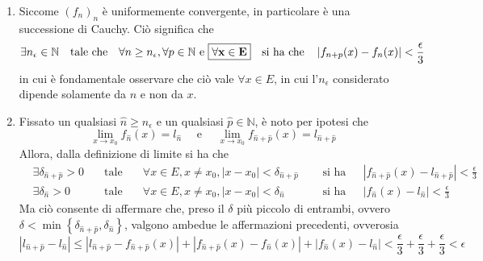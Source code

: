 \documentclass[a4paper]{extarticle}
\begin{document}
\begin{enumerate}
    \item Siccome $(f_n)_n$ è uniformemente convergente, in particolare è una successione di Cauchy. Ciò significa che
    \[\exists n_\epsilon \in \mathbb{N} \hspace{1em} \text{tale che} \hspace{1em} \forall n \geq n_\epsilon, \forall p \in \mathbb{N} \text{ e } \boxed{\bf{\forall x \in E}} \hspace{1em} \text{si ha che} \hspace{1em} \left \vert f_{n+p}(x) - f_n(x)\right \vert < \frac{\epsilon}{3}\]
    in cui è fondamentale osservare che ciò vale $\forall x \in E$, in cui l'$n_\epsilon$ considerato dipende solamente da $n$ e non da $x$.

    \item Fissato un qualsiasi $\hat n \geq n_\epsilon$ e un qualsiasi $\hat p \in \mathbb{N}$, è noto per ipotesi che 
    \[\lim_{x \to x_0} f_{\hat n}(x) = l_{\hat n} \hspace{1em} \text{ e } \hspace{1em} \lim_{x \to x_0} f_{\hat n + \hat p}(x) = l_{\hat n + \hat p}\]
    Allora, dalla definizione di limite si ha che
    \begin{align*}
        &\exists \delta_{\hat n+\hat p} > 0 \hspace{1em} &\text{tale che} \hspace{1em} &\forall x \in E, x \neq x_0, \left \vert x - x_0 \right \vert < \delta_{\hat n + \hat p} \hspace{1em} &\text{ si ha che } \hspace{1em} &\left \vert f_{\hat n + \hat p}(x) - l_{\hat n + \hat p}\right \vert < \frac{\epsilon}{3}\\
        &\exists \delta_{\hat n} > 0 \hspace{1em} &\text{tale che} \hspace{1em} &\forall x \in E, x \neq x_0, \vert x - x_0 \vert < \delta_{\hat n} \hspace{1em} &\text{ si ha che } \hspace{1em} &\left \vert f_{\hat n}(x) - l_{\hat n} \right \vert < \frac{\epsilon}{3}
    \end{align*}
    Ma ciò consente di affermare che, preso il $\delta$ più piccolo di entrambi, ovvero $\delta < \min\left\{\delta_{\hat n + \hat p}, \delta_{\hat n}\right\}$, valgono ambedue le affermazioni precedenti, ovverosia
    \[\left \vert l_{\hat n + \hat p} - l_{\hat n} \right \vert \leq \left \vert l_{\hat n + \hat p} - f_{\hat n + \hat p}(x)\right \vert + \left \vert f_{\hat n + \hat p}(x) - f_{\hat n}(x)\right \vert + \left \vert f_{\hat n}(x) - l_{\hat n}\right \vert < \frac{\epsilon}{3}+\frac{\epsilon}{3}+\frac{\epsilon}{3} < \epsilon\]
\end{enumerate}
\end{document}
